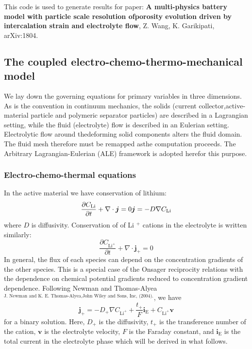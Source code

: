 This code is used to generate results for paper\+: {\bfseries A multi-\/physics battery model with particle scale resolution ofporosity evolution driven by intercalation strain and electrolyte flow}, Z. Wang, K. Garikipati, ar\+Xiv\+:1804.  \hypertarget{battery_particle_section1}{}\subsection{The coupled electro-\/chemo-\/thermo-\/mechanical model}\label{battery_particle_section1}
We lay down the governing equations for primary variables in three dimensions. As is the convention in continuum mechanics, the solids (current collector,active-\/material particle and polymeric separator particles) are described in a Lagrangian setting, while the fluid (electrolyte) flow is described in an Eulerian setting. Electrolytic flow around thedeforming solid components alters the fluid domain. The fluid mesh therefore must be remapped asthe computation proceeds. The Arbitrary Lagrangian-\/\+Eulerian (A\+LE) framework is adopted herefor this purpose. \hypertarget{battery_particle_subsub1}{}\subsubsection{Electro-\/chemo-\/thermal equations}\label{battery_particle_subsub1}
In the active material we have conservation of lithium\+: \[ \frac{\partial C_\text{Li}}{\partial t}+\nabla\cdot\boldsymbol{j}=0\\ \boldsymbol{j}=-D\nabla C_\text{Li} \] where $D$ is diffusivity. Conservation of of Li $^+$ cations in the electrolyte is written similarly\+: \[ \frac{\partial C_{\text{Li}^+}}{\partial t}+\nabla\cdot\boldsymbol{j}_+=0 \] In general, the flux of each species can depend on the concentration gradients of the other species. This is a special case of the Onsager reciprocity relations with the dependence on chemical potential gradients reduced to concentration gradient dependence. Following Newman and Thomas-\/\+Alyea $^{\text{J. Newman and K. E. Thomas-Alyea,John Wiley and Sons, Inc, (2004).}}$, we have \[ \boldsymbol{j}_+=-D_{+}\nabla C_{\text{Li}^+} +\frac{t_+}{F}\boldsymbol{i}_\text{E}+C_{\text{Li}^+}\boldsymbol{v} \] for a binary solution. Here, $D_{+}$ is the diffusivity, $t_+$ is the transference number of the cation, $\boldsymbol{v}$ is the electrolyte velocity, $F$ is the Faraday constant, and $\boldsymbol{i}_\text{E}$ is the total current in the electrolyte phase which will be derived in what follows.


